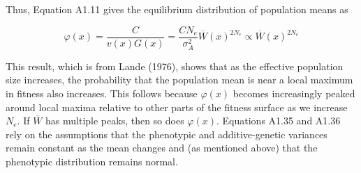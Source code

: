 \documentclass{article}
\begin{document}
Thus, Equation A1.11 gives the equilibrium distribution of population means as

\begin{equation}
\varphi(x)=\frac{C}{v(x)G(x)}=\frac{CN_{e}}{\sigma_{A}^{2}}\overline{W}(x)^{2N_{e}}\propto\overline{W}(x)^{2N_{e}}
\end{equation}

This result, which is from Lande (1976), shows that as the effective population size increases, the probability that the population mean is near a local maximum in fitness also increases. This follows because  $ \varphi(x) $ becomes increasingly peaked around local maxima relative to other parts of the fitness surface as we increase  $ N_e $. If  $ \overline{W} $ has multiple peaks, then so does  $ \varphi(x) $. Equations A1.35 and A1.36 rely on the assumptions that the phenotypic and additive-genetic variances remain constant as the mean changes and (as mentioned above) that the phenotypic distribution remains normal.
\end{document}
